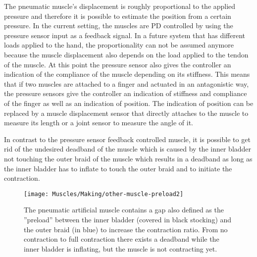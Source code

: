 \documentclass[main]{subfiles}
\begin{document}
The pneumatic muscle's displacement is roughly proportional to the applied pressure and therefore it is possible to estimate the position from a certain pressure. In the current setting, the muscles are PD controlled by using the pressure sensor input as a feedback signal. In a future system that has different loads applied to the hand, the proportionality can not be assumed anymore because the muscle displacement also depends on the load applied to the tendon of the muscle. At this point the pressure sensor also gives the controller an indication of the compliance of the muscle depending on its stiffness. This means that if two muscles are attached to a finger and actuated in an antagonistic way, the pressure sensors give the controller an indication of stiffness and compliance of the finger as well as an indication of position. The indication of position can be replaced by a muscle displacement sensor that directly attaches to the muscle to measure its length or a joint sensor to measure the angle of it.

In contrast to the pressure sensor feedback controlled muscle, it is possible to get rid of the undesired deadband of the muscle which is caused by the inner bladder not touching the outer braid of the muscle which results in a deadband as long as the inner bladder has to inflate to touch the outer braid and to initiate the contraction.

\begin{figure}[htp]
\centering
\texttt{[image: Muscles/Making/other-muscle-preload2]}
\caption[Preloaded pneumatic artificial muscle]{The pneumatic artificial muscle contains a gap also defined as the ''preload'' between the inner bladder (covered in black stocking) and the outer braid (in blue) to increase the contraction ratio. From no contraction to full contraction there exists a deadband while the inner bladder is inflating, but the muscle is not contracting yet.}
\label{pressure-sensor}
\end{figure}
\end{document}

